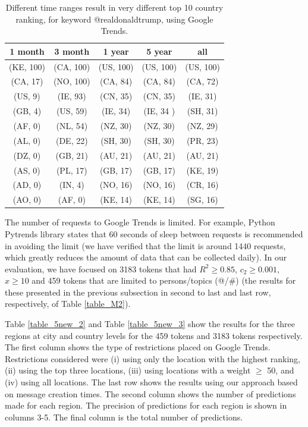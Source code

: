 \begin{table}
\small
\caption[Top Country Ranking for keyword @realdonaldtrump using Google Trends]{Different time ranges result in very different top 10 country ranking, for keyword @realdonaldtrump, using Google Trends.}
\label{table_5new_1}
\begin{center}
\begin{tabular}{|c|c|c|c|c|}
\hline
\bfseries 1 month & \bfseries 3 month & \bfseries 1 year & \bfseries 5 year & \bfseries all\\
\hline
(KE, 100)&(CA, 100)&(US, 100)&(US, 100)&(US, 100)\\
\hline
(CA, 17)&(NO, 100)&(CA, 84)&(CA, 84)&(CA, 72)\\
\hline
(US, 9)&(IE, 93)&(CN, 35)&(CN, 35)&(IE, 31)\\
\hline
(GB, 4)&(US, 59)&(IE, 34)&(IE, 34	)&(SH, 31)\\
\hline
(AF, 0)&(NL, 54)&(NZ, 30)&(NZ, 30)&(NZ, 29)\\
\hline
(AL, 0)&(DE, 22)&(SH, 30)&(SH, 30)&(PR, 23)\\
\hline
(DZ, 0)&(GB, 21)&(AU, 21)&(AU, 21)&(AU, 21)\\
\hline
(AS, 0)&(PL, 17)&(GB, 17)&(GB, 17)&(KE, 19)\\
\hline
(AD, 0)&(IN, 4)&(NO, 16)&(NO, 16)&(CR, 16)\\
\hline
(AO, 0)&(AF, 0)&(KE, 14)&(KE, 14)&(SG, 16)\\
\hline
\end{tabular}
\end{center}
\end{table}

The number of requests to Google Trends is limited. For example, Python Pytrends library states that 60 seconds of sleep between requests is recommended in avoiding the limit (we have verified that the limit is around 1440 requests, which greatly reduces the amount of data that can be collected daily). In our evaluation, we have focused on 3183 tokens that had $R^2\geq0.85$, $c_2\geq0.001$, $x\geq10$ and 459 tokens that are limited to persons/topics (@/\#) (the results for these presented in the previous subsection in second to last and last row, respectively, of Table \ref{table_M2}).

Table \ref{table_5new_2} and Table \ref{table_5new_3} show the results for the three regions at city and country levels for the 459 tokens and 3183 tokens respectively. The first column shows the type of restrictions placed on Google Trends. Restrictions considered were (i) using only the location with the highest ranking, (ii) using the top three locations, (iii) using locations with a weight $\geq$ 50, and (iv) using all locations. The last row shows the results using our approach based on message creation times. The second column shows the number of predictions made for each region. The precision of predictions for each region is shown in columns 3-5. The final column is the total number of predictions. 

